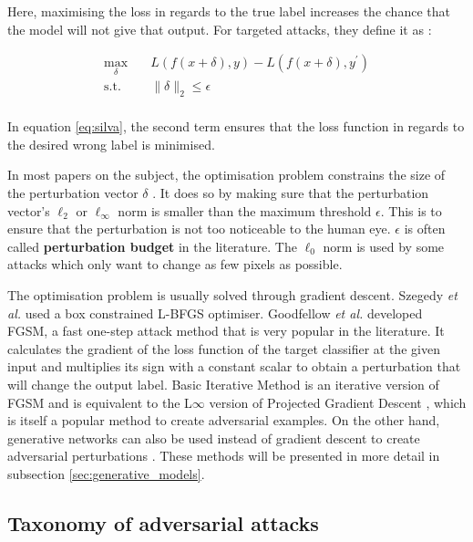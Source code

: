 Here, maximising the loss in regards to the true label increases the chance that the model will not give that output. For targeted attacks, they define it as :

\begin{equation}
\label{eq:silva}
\begin{aligned}
\max_{\delta} \quad & L(f(x + \delta), y) - L(f(x + \delta), y^\prime)\\
\textrm{s.t.} \quad& \|\delta\|_2\leq\epsilon   \\
\end{aligned}
\end{equation}

In equation \ref{eq:silva}, the second term ensures that the loss function in regards to the desired wrong label is minimised.

In most papers on the subject, the optimisation problem constrains the size of the perturbation vector $\delta$ \cite{akhtar, silva_survey, tnnls_survey}. It does so by making sure that the perturbation vector's $\ell_2$ or $\ell_\infty$ norm is smaller than the maximum threshold $\epsilon$. This is to ensure that the perturbation is not too noticeable to the human eye. $\epsilon$ is often called \textbf{perturbation budget} in the literature. The $\ell_0$ norm is used by some attacks \cite{akhtar} which only want to change as few pixels as possible. 

The optimisation problem is usually solved through gradient descent. Szegedy \textit{et al.} \cite{szegedy2014intriguing} used a box constrained L-BFGS optimiser. Goodfellow \textit{et al.} \cite{fgsm} developed FGSM, a fast one-step attack method that is very popular in the literature. It calculates the gradient of the loss function of the target classifier at the given input and multiplies its sign with a constant scalar to obtain a perturbation that will change the output label.  Basic Iterative Method is an iterative version of FGSM \cite{kurakin2016adversarial} and is equivalent to the L$\infty$ version of Projected Gradient Descent \cite{madry2019deep}, which is itself a popular method to create adversarial examples. On the other hand, generative networks can also be used instead of gradient descent to create adversarial perturbations \cite{upset_angri, zheng_black_box_GAN, advGAN}. These methods will be presented in more detail in subsection \ref{sec:generative_models}. 

\subsection{Taxonomy of adversarial attacks}

